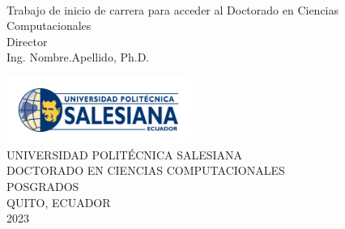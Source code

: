 \newpage
 \thispagestyle{empty}%
     \begin{center}
        \large\uppercase\expandafter{\textbf{
            \patTitulo
        }}
     \end{center}

     \begin{center}
         \vskip2cm
         \large\expandafter{\textbf{
            \patNombre
         }}  \\
         \vfill
         \normalsize 
            Trabajo de inicio de carrera para acceder al Doctorado en Ciencias Computacionales\\
         \vskip1cm
         \normalsize Director\\
         \vskip0.3cm
         \normalsize Ing. Nombre.Apellido, Ph.D. \\
     \end{center}
     \vfill
    \begin{center}
        \includegraphics[width=6cm]{logoups.png}\\
        \uppercase\expandafter{Universidad Politécnica Salesiana} \\
        \uppercase\expandafter{DOCTORADO EN CIENCIAS COMPUTACIONALES} \\
        \uppercase\expandafter{Posgrados} \\
        \uppercase\expandafter{Quito, Ecuador} \\
        \uppercase\expandafter{2023}
    \end{center}